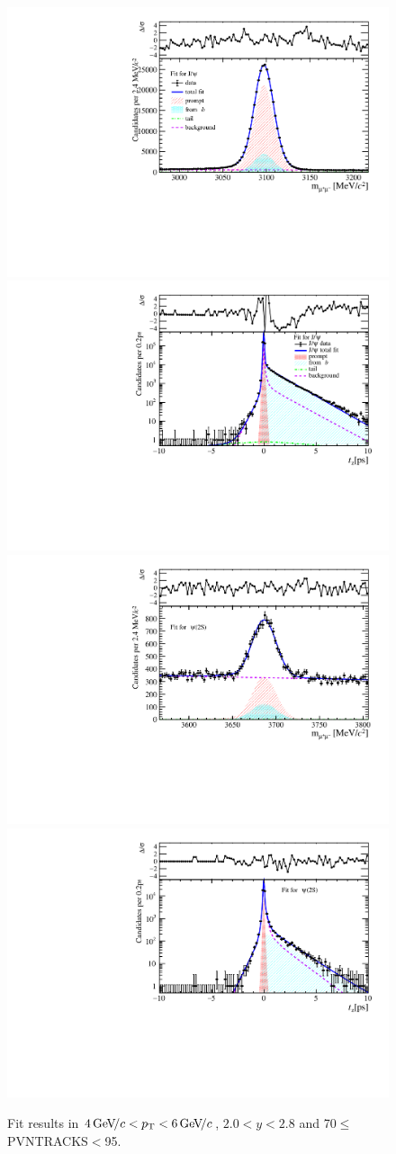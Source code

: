 \begin{figure}[H]
\begin{center}
\includegraphics[width=0.47\linewidth]{pdf/Jpsi/drawmass/n4y1pt3.pdf}
\includegraphics[width=0.47\linewidth]{pdf/Jpsi/2DFit/n4y1pt3.pdf}
\vspace*{-0.5cm}
\includegraphics[width=0.47\linewidth]{pdf/Psi2S/drawmass/n4y1pt3.pdf}
\includegraphics[width=0.47\linewidth]{pdf/Psi2S/2DFit/n4y1pt3.pdf}
\vspace*{-0.5cm}
\end{center}
\caption{Fit results in $4\text{\,Ge\kern -0.1em V\!/}c<p_{\mathrm{T}}<6\text{\,Ge\kern -0.1em V\!/}c$, $2.0<y<2.8$ and 70$\leq$PVNTRACKS$<$95.}
\label{Fitn4y1pt3}
\end{figure}
